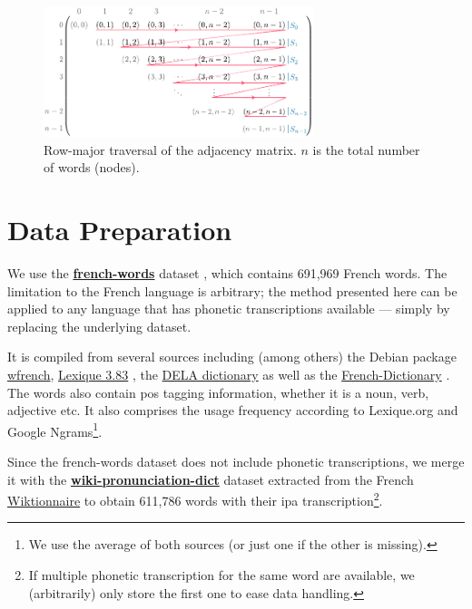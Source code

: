 \begin{figure}
    \centering
    \includegraphics[width=0.7\textwidth]{assets/illustrator/traverse-schema.pdf}
    \caption{Row-major traversal of the adjacency matrix. $n$ is the total number of words (\ie nodes).}
    \label{fig:traverse-schema}
\end{figure}

\section{Data Preparation}
\label{sec:data}

We use the \href{https://github.com/frodonh/french-words}{\textbf{french-words}} dataset \cite{data_french_words}, which contains 691,969 French words. The limitation to the French language is arbitrary; the method presented here can be applied to any language that has phonetic transcriptions available — simply by replacing the underlying dataset.

It is compiled from several sources including (among others) the Debian package \href{https://packages.debian.org/fr/sid/wfrench}{wfrench}, \href{http://www.lexique.org/}{Lexique 3.83} \cite{data_lexique}, the \href{https://infolingu.univ-mlv.fr/DonneesLinguistiques/Dictionnaires/telechargement.html}{DELA dictionary} \cite{data_dela} as well as the \href{https://github.com/hbenbel/French-Dictionary}{French-Dictionary} \cite{data_french_csv}. The words also contain \acrfull{pos} tagging information, \eg whether it is a noun, verb, adjective etc. It also comprises the usage frequency according to Lexique.org and Google Ngrams\footnote{We use the average of both sources (or just one if the other is missing).}.

Since the french-words dataset does not include phonetic transcriptions, we merge it with the \href{https://github.com/DanielSWolf/wiki-pronunciation-dict}{\textbf{wiki-pronunciation-dict}} \cite{data_pronunciation} dataset extracted from the French \href{https://fr.wiktionary.org/}{Wiktionnaire} to obtain 611,786 words with their \gls{ipa} transcription\footnote{If multiple phonetic transcription for the same word are available, we (arbitrarily) only store the first one to ease data handling.}.

